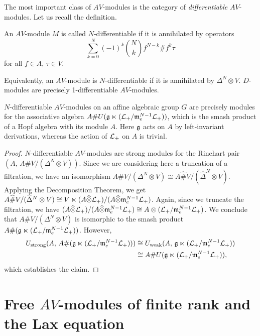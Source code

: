 \documentclass[12pt]{amsart}
\begin{document}
The most important class of $AV$-modules is the category of \emph{differentiable} $AV$-modules. Let us recall the definition.

\begin{definition}
An $AV$-module $M$ is called $N$-differentiable if it is annihilated by operators
$$\sum_{k=0}^N (-1)^k {N \choose k} f^{N-k} \# f^k \tau$$
for all $f \in A$, $\tau \in V$. 
\end{definition}
Equivalently, an $AV$-module is $N$-differentiable if it is annihilated by $\Delta^N \otimes V$.
$D$-modules are precisely 1-differentiable $AV$-modules.
\begin{corollary}
\label{Ndiff}
$N$-differentiable $AV$-modules on an affine algebraic group $G$ are precisely modules for the associative algebra $A \# U(\mathfrak{g} \ltimes ({\mathcal L}_+ / \mathfrak{m}_e^{N-1} {\mathcal L}_+))$, which is the smash product of a Hopf algebra with its module $A$. Here $\mathfrak{g}$ acts on $A$ by left-invariant derivations, whereas the action of ${\mathcal L}_+$ on $A$ is trivial. 
\end{corollary}
\begin{proof}
$N$-differentiable $AV$-modules are strong modules for the Rinehart pair \break
$(A, \, A\#V / (\Delta^N \otimes V))$. Since we are considering here a truncation of a filtration, we have an isomorphism $A\#V / (\Delta^N \otimes V) \cong A\widehat\#V / (\widehat\Delta^N \otimes V)$.
Applying the Decomposition Theorem, we get 
$A\widehat\#V / (\widehat\Delta^N \otimes V) \cong V \ltimes (A \widehat\otimes {\mathcal L}_+)/(A \widehat\otimes \mathfrak{m}_e^{N-1} {\mathcal L}_+)$. Again, since we truncate the filtration, we have 
$(A \widehat\otimes {\mathcal L}_+)/(A \widehat\otimes \mathfrak{m}_e^{N-1} {\mathcal L}_+) \cong A \otimes ({\mathcal L}_+ / \mathfrak{m}_e^{N-1}{\mathcal L}_+)$. We conclude that $A\#V / (\Delta^N \otimes V)$ is isomorphic to the smash product
$A \# (\mathfrak{g} \ltimes ({\mathcal L}_+ / \mathfrak{m}_e^{N-1}{\mathcal L}_+))$. However,
\begin{align*}
U_\text{strong} (A, \, A \# (\mathfrak{g} \ltimes ({\mathcal L}_+ / \mathfrak{m}_e^{N-1}{\mathcal L}_+))) 
&\cong U_\text{weak} (A, \, \mathfrak{g} \ltimes ({\mathcal L}_+ / \mathfrak{m}_e^{N-1}{\mathcal L}_+)) \\
&\cong A \# U( \mathfrak{g} \ltimes ({\mathcal L}_+ / \mathfrak{m}_e^{N-1}{\mathcal L}_+)),
\end{align*}
which establishes the claim.
\end{proof}

\section{Free $AV$-modules of finite rank and the Lax equation}
\end{document}
